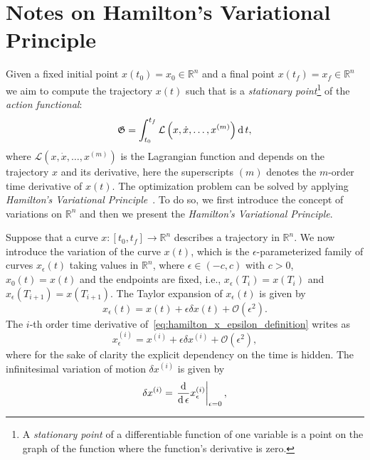 \section{Notes on Hamilton's Variational Principle\label{appendix:hamilton}}
Given a fixed initial point $x(t_0) = x_0 \in \mathbb{R}^n$ and a final point $x(t_f) = x_f \in \mathbb{R}^n$ we aim to compute the trajectory $x(t)$ such that is a \emph{stationary point}\footnote{A \emph{stationary point} of a differentiable function of one variable is a point on the graph of the function where the function's derivative is zero.} of the \emph{action functional}:
\begin{equation}
    \label{eq:hamilton_x_epsilon_definition_optimization}
   \mathfrak{G} = \int_{t_0}^{t_f} \mathcal{L}\left(x, \dot{x}, \hdots, x^{(m)}\right) \operatorname{d} t,
\end{equation}
where $\mathcal{L}\left(x, \dot{x}, \hdots, x^{(m)}\right)$ is the Lagrangian function and depends on the trajectory $x$ and its derivative, here the superscripts $(m)$ denotes the $m$-order time derivative of $x(t)$. 
The optimization problem can be solved by applying \emph{Hamilton's Variational Principle}~\citep{Liberzon2012CalculusTheory}. To do so, we first introduce the concept of variations on $\mathbb{R}^n$ and then we present the \emph{Hamilton’s Variational Principle}.
\par
Suppose that a curve $x:[t_0, t_f] \rightarrow \mathbb{R}^n$ describes a trajectory in $\mathbb{R}^n$. We now introduce the variation of the curve $x(t)$, which is the $\epsilon$-parameterized family of curves $x_\epsilon(t)$ taking values in $\mathbb{R}^n$, where $\epsilon \in (-c, c)$ with $c>0$, $x_0(t) = x(t)$ and the endpoints are fixed, i.e., $x_\epsilon(T_i) = x(T_i)$ and $x_\epsilon(T_{i+1}) = x(T_{i+1})$. The Taylor expansion of $x_\epsilon(t)$ is given by
\begin{equation}
\label{eq:hamilton_x_epsilon_definition}
x_\epsilon(t) = x(t) + \epsilon \delta x(t) + \mathcal{O}\left(\epsilon^2\right).
\end{equation}
The $i$-th order time derivative of~\eqref{eq:hamilton_x_epsilon_definition} writes as
\begin{equation}
    x_\epsilon^{(i)} = x ^{(i)} + \epsilon \delta x^{(i)} + \mathcal{O}\left(\epsilon^2\right),
\end{equation}
where for the sake of clarity the explicit dependency on the time is hidden. 
The infinitesimal variation of motion $\delta x^{(i)}$ is given by
\begin{equation}
    \delta x^{(i)}  = \left.\frac{\operatorname{d}}{\operatorname{d} \epsilon} x^{(i)}_\epsilon\right|_{\epsilon = 0},
\end{equation}
